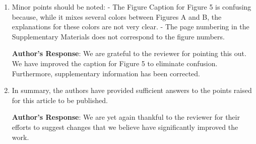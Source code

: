 \documentclass[11pt, a4paper]{article}
\begin{document}
\begin{enumerate}
    \textbf{Author's Response}:  We are yet again thankful to the reviewer for finding our changes as an improvement that we could do to the best of our abilities. 
    
 
    \item Minor points should be noted: - The Figure Caption for Figure 5 is confusing because, while it mixes several colors between Figures A and B, the explanations for these colors are not very clear. - The page numbering in the Supplementary Materials does not correspond to the figure numbers. 
    
      \textbf{Author's Response}: We are grateful to the reviewer for pointing this out. We have improved the caption for Figure 5 to eliminate confusion. Furthermore, supplementary information has been corrected.

    
    \item In summary, the authors have provided sufficient answers to the points raised for this article to be published.
    
    \textbf{Author's Response}:  We are yet again thankful to the reviewer for their efforts to suggest changes that we believe have significantly improved the work. 
    

\end{enumerate}
\end{document}

